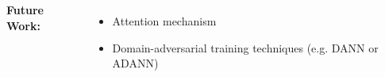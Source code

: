\documentclass[23pt, a0paper,
               colspace=10mm, subcolspace=0mm,
               blockverticalspace=12mm, landscape]{tikzposter} %
\begin{document}
\begin{columns}
{    \textbf{Future Work:}
    \begin{itemize}
        \item  Attention mechanism
        \item Domain-adversarial training techniques (e.g. DANN or ADANN)
    \end{itemize}
  }
  
\end{columns}
\end{document}
